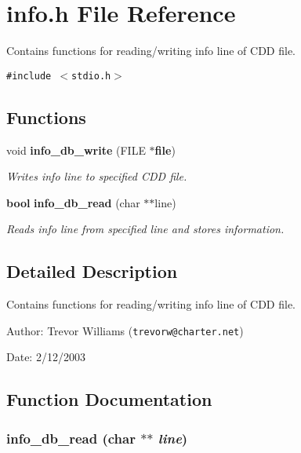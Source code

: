 \section{info.h File Reference}
\label{info_8h}
Contains functions for reading/writing info line of CDD file.  


{\tt \#include $<$stdio.h$>$}\par
\subsection*{Functions}
\begin{CompactItemize}
\item 
void {\bf info\_\-db\_\-write} (FILE $\ast${\bf file})
\begin{CompactList}\small\item\em Writes info line to specified CDD file. \item\end{CompactList}\item 
{\bf bool} {\bf info\_\-db\_\-read} (char $\ast$$\ast$line)
\begin{CompactList}\small\item\em Reads info line from specified line and stores information. \item\end{CompactList}\end{CompactItemize}


\subsection{Detailed Description}
Contains functions for reading/writing info line of CDD file. 

\begin{Desc}
\item[Author:]Trevor Williams ({\tt trevorw@charter.net}) \end{Desc}
\begin{Desc}
\item[Date:]2/12/2003 \end{Desc}


\subsection{Function Documentation}
\subsubsection{ info\_\-db\_\-read (char $\ast$$\ast$ {\em line})}\label{info_8h_a1}


